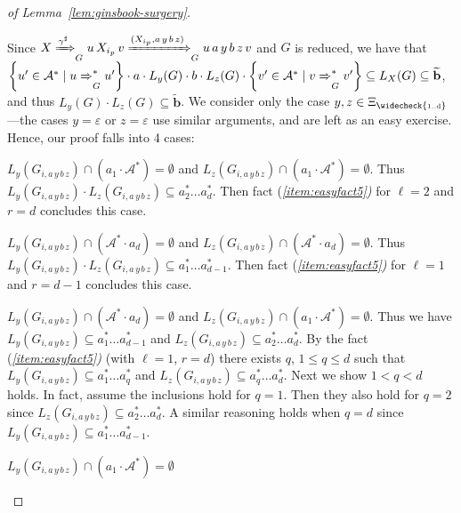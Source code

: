 \documentclass[final]{llncs}
\def\set#1{{\left\{ #1 \right\}}}
\def\patt{{\widetilde{\mathbf{b}}}}
\def\Varsi{\ensuremath{\Xi_{\widecheck{\text{\tiny 1..d}}}}}
\begin{document}
\begin{proof}[of Lemma~\ref{lem:ginsbook-surgery}]
\begin{compactenum}[1.]
  \item Since $X \xRightarrow{\gamma^\sharp}_G u \, X_{i_p} \, v
    \xRightarrow{(X_{i_p}, a\, y\, b\, z)}_G u \, a\, y \, b\, z \, v$ and $G$
    is reduced, we have that $\set{u' \in \mathcal{A}^*
      \mid u \xRightarrow{}^*_G u'} \cdot a \cdot L_y(G) \cdot b \cdot L_z(G) \cdot
    \set{v' \in \mathcal{A}^* \mid v \xRightarrow{}^*_G v'} \subseteq
    L_X(G) \subseteq \patt$, and thus $L_y(G) \cdot L_z(G) \subseteq
    \patt$. We consider only the case $y,z \in \Varsi$---the cases
    $y=\varepsilon$ or $z=\varepsilon$ use similar arguments, and are left as an
    easy exercise. Hence, our proof falls into 4 cases:
    \begin{compactenum}
    \item \(L_y(G_{i,a\, y\, b\, z})\cap (a_1\cdot\mathcal{A}^*) = \emptyset \)
      and \( L_z(G_{i,a\, y\, b\, z}) \cap (a_1\cdot\mathcal{A}^*) = \emptyset \).
      Thus \( L_y(G_{i,a\, y\, b\, z})\cdot L_z(G_{i,a\, y\, b\, z}) \subseteq a_2^* \ldots
			a_d^*\). Then fact {\upshape(\itshape\ref{item:easyfact5}\upshape)} for \(\ell=2\) and
      \(r=d\) concludes this case.
    \item \(L_y(G_{i,a\, y\, b\, z})\cap (\mathcal{A}^*\cdot a_d) = \emptyset \)
      and \( L_z(G_{i,a\, y\, b\, z}) \cap (\mathcal{A}^*\cdot a_d) = \emptyset
      \).  Thus \(L_y(G_{i,a\, y\, b\, z}) \cdot L_z(G_{i,a\, y\, b\, z}) \subseteq a_1^*
			\ldots a_{d-1}^*\). Then fact {\upshape(\itshape\ref{item:easyfact5}\upshape)} for
      \(\ell=1\) and \(r=d-1\) concludes this case.
    \item \(L_y(G_{i,a\, y\, b\, z})\cap (\mathcal{A}^*\cdot a_d) = \emptyset \)
      and \( L_z(G_{i,a\, y\, b\, z}) \cap (a_1\cdot \mathcal{A}^*) = \emptyset
      \). Thus we have \( L_y(G_{i,a\, y\, b\, z}) \subseteq a_1^* \ldots
      a_{d-1}^* \) and \( L_z(G_{i,a\, y\, b\, z}) \subseteq a_2^* \ldots
			a_{d}^*\).  By the fact {\upshape(\itshape\ref{item:easyfact5}\upshape)} (with \(\ell=1\),
      \(r=d\)) there exists \(q\), \(1\leq q\leq d\) such that
      \(L_y(G_{i,a\, y\, b\, z}) \subseteq a_1^* \ldots a_q^*\) and \(L_z(G_{i,a\, y\, b\, z})
      \subseteq a_q^* \ldots a_d^*\). Next we show \( 1 < q < d \)
      holds.  In fact, assume the inclusions hold for \(q=1\). Then
      they also hold for \(q=2\) since \(L_z(G_{i,a\, y\, b\, z}) \subseteq a_2^*
      \ldots a_d^*\).  A similar reasoning holds when \(q=d\) since
      \(L_y(G_{i,a\, y\, b\, z}) \subseteq a_1^* \ldots a_{d-1}^* \).
    \item \(L_y(G_{i,a\, y\, b\, z})\cap (a_1\cdot \mathcal{A}^*) = \emptyset \)

\end{compactenum}
\end{compactenum}
\end{proof}
\end{document}
